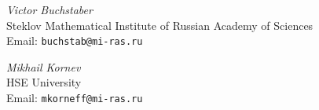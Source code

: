 \documentclass[14pt,dvipsnames]{extarticle}
\numberwithin{equation}{subsection}
\theoremstyle{plain}
\theoremstyle{definition}
\theoremstyle{definition}
\begin{document}
\printbibliography[heading=bibliography]

\bigskip

\noindent\begin{minipage}{\linewidth}
\noindent
{\itshape Victor Buchstaber}\\
Steklov Mathematical Institute of Russian Academy of Sciences\\
Email: \texttt{buchstab@mi-ras.ru}

\vspace{1.5em}

\noindent
{\itshape Mikhail Kornev}\\
HSE University\\
Email: \texttt{mkorneff@mi-ras.ru}

\end{minipage}

\end{document}
